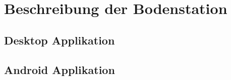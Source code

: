 \section{Beschreibung der Bodenstation}
\subsection{Desktop Applikation}















\subsection{Android Applikation}
